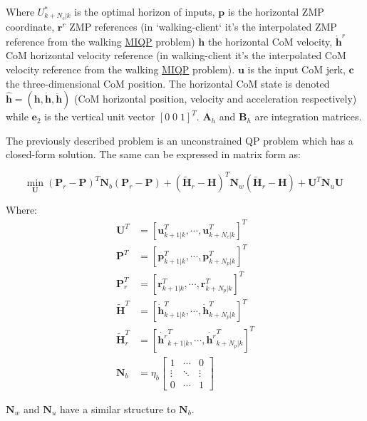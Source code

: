 \-Where ${U}_{k+N_c|k}^*$ is the optimal horizon of inputs, $\mathbf{p}$ is the horizontal \-Z\-M\-P coordinate, $ \mathbf{r}^r $ \-Z\-M\-P references (in `walking-\/client` it's the interpolated \-Z\-M\-P reference from the walking \hyperlink{namespaceMIQP}{\-M\-I\-Q\-P} problem) $ \mathbf{\dot{h}} $ the horizontal \-Co\-M velocity, $ \mathbf{\dot{h}}^r $ \-Co\-M horizontal velocity reference (in walking-\/client it's the interpolated \-Co\-M velocity reference from the walking \hyperlink{namespaceMIQP}{\-M\-I\-Q\-P} problem). $\mathbf{u}$ is the input \-Co\-M jerk, $\mathbf{c}$ the three-\/dimensional \-Co\-M position. \-The horizontal \-Co\-M state is denoted $\hat{\mathbf{h}} = (\mathbf{h}, \mathbf{\dot{h}}, \mathbf{\ddot{h}}) $ (\-Co\-M horizontal position, velocity and acceleration respectively) while $\mathbf{e}_2$ is the vertical unit vector $ [0\;0\;1]^T$. $\mathbf{A}_h$ and $\mathbf{B}_h$ are integration matrices.

\-The previously described problem is an unconstrained \-Q\-P problem which has a closed-\/form solution. \-The same can be expressed in matrix form as\-:

\[ \underset{\mathbf{U}}{\text{min}} \; (\mathbf{P}_r - \mathbf{P})^T \mathbf{N}_b (\mathbf{P}_r - \mathbf{P}) + (\tilde{\mathbf{H}}_r - \mathbf{H})^T\mathbf{N}_w(\tilde{\mathbf{H}}_r - \mathbf{H}) + \mathbf{U}^T\mathbf{N}_u \mathbf{U} \]

\-Where\-: \begin{align*} \mathbf{U}^T &= \left[ \mathbf{u}^T_{k+1|k}, \cdots, \mathbf{u}^T_{k+N_c|k} \right]^T \\ \mathbf{P}^T &= \left[ \mathbf{p}^T_{k+1|k}, \cdots, \mathbf{p}^T_{k+N_p|k} \right]^T \\ \mathbf{P}^T_r &= \left[ \mathbf{r}^T_{k+1|k}, \cdots, \mathbf{r}^T_{k+N_p|k} \right]^T \\ \mathbf{\tilde{H}}^T &= \left[ \dot{\mathbf{h}}^T_{k+1|k}, \cdots, \dot{\mathbf{h}}^T_{k+N_p|k} \right]^T \\ \mathbf{\tilde{H}}^T_r &= \left[ \dot{\mathbf{h}^r}^T_{k+1|k}, \cdots, \dot{\mathbf{h}^r}^T_{k+N_p|k} \right]^T \\ \mathbf{N}_b &= \eta_b\left[\begin{array}{ccc} 1 & \cdots & 0 \\ \vdots & \ddots & \vdots\\ 0 & \cdots & 1 \end{array}\right] \end{align*}

$\mathbf{N}_w$ and $\mathbf{N}_u$ have a similar structure to $\mathbf{N}_b$.

